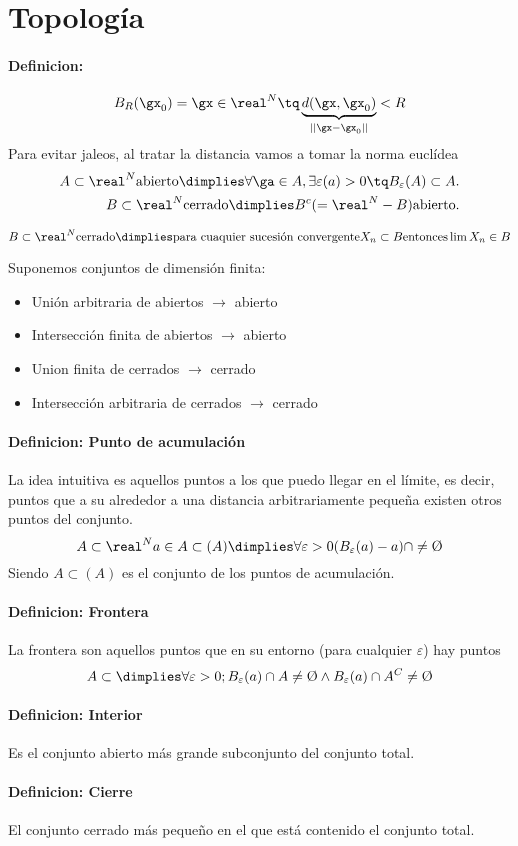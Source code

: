 \documentclass[a4paper,10pt]{apuntes}
\newcommand{\definition}[1]{\paragraph{Definicion: #1\\}}
\begin{document}
\section{Topología}
\definition{}
$$B_R(\gx_0) = {\gx \in \real^N \tq \underbrace{d(\gx,\gx_0)}_{||\gx-\gx_0||} < R }$$
Para evitar jaleos, al tratar la distancia vamos a tomar la norma euclídea
\begin{align*}
A \subset \real^N  \text{abierto} \dimplies \forall \ga\in A, \exists \varepsilon(a) > 0 \tq B_\varepsilon(A) \subset A.\\
B \subset \real^N \text{cerrado} \dimplies B^c(= \real^N-B) \text{abierto}.
\end{align*}
\begin{theorem}
$$B \subset \real^N \text{cerrado} \dimplies \text{para cuaquier sucesión convergente} {X_n} \subset B \text{entonces} \lim X_n \in B$$
 
\end{theorem}
\begin{theorem}
Suponemos conjuntos de dimensión finita:
\begin{itemize}
 \item Unión arbitraria de abiertos $\rightarrow$ abierto
 \item Intersección finita de abiertos $\rightarrow$ abierto
 \item Union finita de cerrados $\rightarrow$ cerrado
 \item Intersección arbitraria de cerrados $\rightarrow$ cerrado
\end{itemize} 
\end{theorem}

\definition{Punto de acumulación}
La idea intuitiva es aquellos puntos a los que puedo llegar en el límite, es decir, puntos que a su alrededor a una distancia arbitrariamente pequeña existen otros puntos del conjunto.
$$A\subset \real^N a \in A \subset(A) \dimplies  \forall \varepsilon > 0 ( B_{\varepsilon} (a) - {a} ) \cap \neq \text{\O} $$
Siendo $A \subset (A)$ es el conjunto de los puntos de acumulación.
\definition{Frontera }%
La frontera son aquellos puntos que en su entorno (para cualquier $\varepsilon$) hay puntos
$$A \subset %
\dimplies \forall \varepsilon>0 ; B_\varepsilon (a) \cap A \neq \text{\O} \wedge B_{\varepsilon} (a) \cap A^C \neq \text{\O} $$
\definition{Interior}
Es el conjunto abierto más grande subconjunto del conjunto total.
\definition{Cierre}
El conjunto cerrado más pequeño en el que está contenido el conjunto total.
\end{document}
